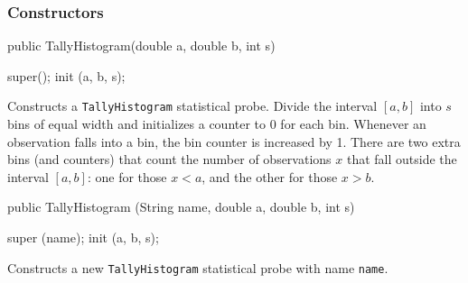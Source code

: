 \subsubsection* {Constructors}
\begin{code}

   public TallyHistogram(double a, double b, int s) \begin{hide} {
      super();
      init (a, b, s);
   }\end{hide}
\end{code}
\begin{tabb}  Constructs a \texttt{TallyHistogram} statistical probe.
Divide the interval $[a,b]$ into $s$ bins of equal width and initializes
a counter to 0 for each bin. Whenever an observation falls into a bin,
the bin counter is increased by 1. There are two extra bins (and counters)
that count the number of observations $x$ that fall outside the interval 
$[a,b]$: one for those $x< a$, and the other for  those $x > b$.
\end{tabb}
\begin{htmlonly}
\end{htmlonly}
\begin{code}

   public TallyHistogram (String name, double a, double b, int s) \begin{hide} {
      super (name);
      init (a, b, s);
   }\end{hide}
\end{code}
\begin{tabb} Constructs a new \texttt{TallyHistogram} statistical probe with
name \texttt{name}.
\end{tabb}
\begin{htmlonly}
\end{htmlonly}



